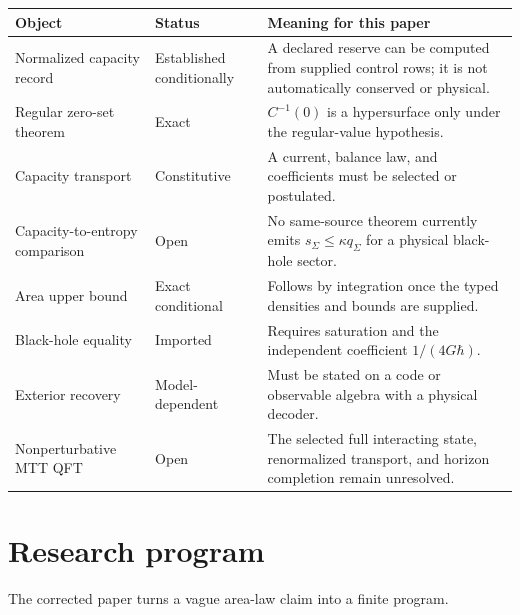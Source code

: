 \documentclass[11pt,a4paper]{article}
\numberwithin{equation}{section}
\theoremstyle{definition}
\theoremstyle{remark}
\begin{document}
\begin{center}
\begin{tabularx}{\textwidth}{@{}>{\raggedright\arraybackslash}p{}
  >{\raggedright\arraybackslash}p{}X@{}}
\toprule
Object & Status & Meaning for this paper\\
\midrule
Normalized capacity record
& Established conditionally
& A declared reserve can be computed from supplied control rows; it is
  not automatically conserved or physical.\\
Regular zero-set theorem
& Exact
& \(C^{-1}(0)\) is a hypersurface only under the regular-value
  hypothesis.\\
Capacity transport
& Constitutive
& A current, balance law, and coefficients must be selected or
  postulated.\\
Capacity-to-entropy comparison
& Open
& No same-source theorem currently emits \(s_\Sigma\leq\kappa q_\Sigma\)
  for a physical black-hole sector.\\
Area upper bound
& Exact conditional
& Follows by integration once the typed densities and bounds are
  supplied.\\
Black-hole equality
& Imported
& Requires saturation and the independent coefficient
  \(1/(4G\hbar)\).\\
Exterior recovery
& Model-dependent
& Must be stated on a code or observable algebra with a physical
  decoder.\\
Nonperturbative MTT QFT
& Open
& The selected full interacting state, renormalized transport, and
  horizon completion remain unresolved.\\
\bottomrule
\end{tabularx}
\end{center}

\section{Research program}

The corrected paper turns a vague area-law claim into a finite program.
\end{document}
